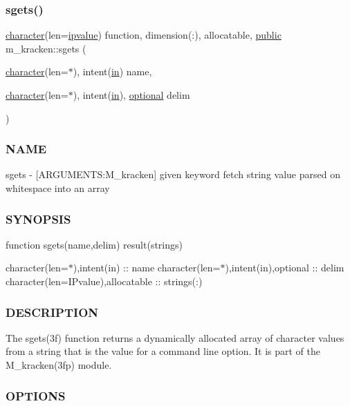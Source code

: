 \subsubsection{\texorpdfstring{sgets()}{sgets()}}
{\footnotesize\ttfamily \hyperlink{option__stopwatch_83_8txt_abd4b21fbbd175834027b5224bfe97e66}{character}(len=\hyperlink{namespacem__kracken_a9e71724677cede703e1fb186e446349f}{ipvalue}) function, dimension(\+:), allocatable, \hyperlink{M__stopwatch_83_8txt_a2f74811300c361e53b430611a7d1769f}{public} m\+\_\+kracken\+::sgets (\begin{DoxyParamCaption}\item[{\hyperlink{option__stopwatch_83_8txt_abd4b21fbbd175834027b5224bfe97e66}{character}(len=$\ast$), intent(\hyperlink{M__journal_83_8txt_afce72651d1eed785a2132bee863b2f38}{in})}]{name,  }\item[{\hyperlink{option__stopwatch_83_8txt_abd4b21fbbd175834027b5224bfe97e66}{character}(len=$\ast$), intent(\hyperlink{M__journal_83_8txt_afce72651d1eed785a2132bee863b2f38}{in}), \hyperlink{option__stopwatch_83_8txt_aa4ece75e7acf58a4843f70fe18c3ade5}{optional}}]{delim }\end{DoxyParamCaption})}



\subsubsection*{N\+A\+ME}

sgets -\/ \mbox{[}A\+R\+G\+U\+M\+E\+N\+TS\+:M\+\_\+kracken\mbox{]} given keyword fetch string value parsed on whitespace into an array \subsubsection*{S\+Y\+N\+O\+P\+S\+IS}

function sgets(name,delim) result(strings)

character(len=$\ast$),intent(in) \+:\+: name character(len=$\ast$),intent(in),optional \+:\+: delim character(len=I\+Pvalue),allocatable \+:\+: strings(\+:)

\subsubsection*{D\+E\+S\+C\+R\+I\+P\+T\+I\+ON}

The sgets(3f) function returns a dynamically allocated array of character values from a string that is the value for a command line option. It is part of the M\+\_\+kracken(3fp) module. \subsubsection*{O\+P\+T\+I\+O\+NS}

